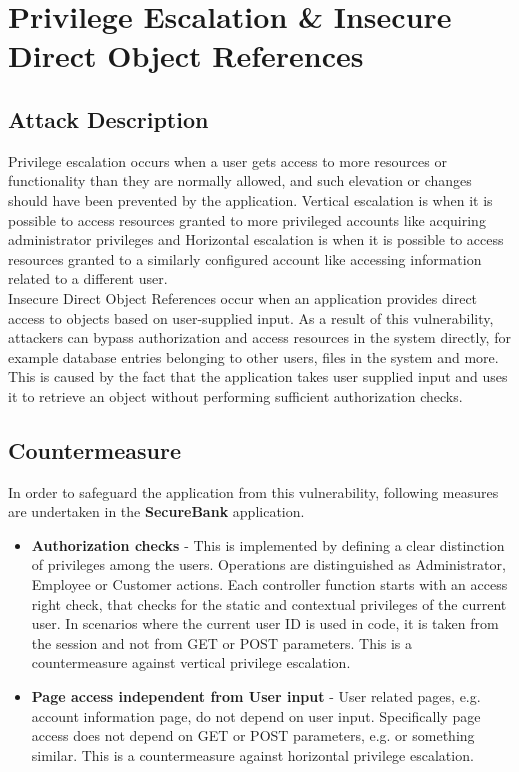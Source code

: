 \section{Privilege Escalation \& Insecure Direct Object References}

\subsection{Attack Description}
Privilege escalation occurs when a user gets access to more resources or functionality than they are normally allowed, and such elevation or changes should have been prevented by the application. Vertical escalation is when it is possible to access resources granted to more privileged accounts like acquiring administrator privileges and Horizontal escalation is when it is possible to access resources granted to a similarly configured account like accessing information related to a different user. \\

Insecure Direct Object References occur when an application provides direct access to objects based on user-supplied input. As a result of this vulnerability, attackers can bypass authorization and access resources in the system directly, for example database entries belonging to other users, files in the system and more. This is caused by the fact that the application takes user supplied input and uses it to retrieve an object without performing sufficient authorization checks.

\subsection{Countermeasure}
In order to safeguard the application from this vulnerability, following measures are undertaken in the \textbf{SecureBank} application.
\begin{itemize}
\item \textbf{Authorization checks} - This is implemented by defining a clear distinction of privileges among the users. Operations are distinguished as Administrator, Employee or Customer actions. Each controller function starts with an access right check, that checks for the static and contextual privileges of the current user. In scenarios where the current user ID is used in code, it is taken from the session and not from GET or POST parameters. This is a countermeasure against vertical privilege escalation.
\item \textbf{Page access independent from User input} - User related pages, e.g. account information page, do not depend on user input. Specifically page access does not depend on GET or POST parameters, e.g.  or something similar. This is a countermeasure against horizontal privilege escalation.
\end{itemize}

\clearpage